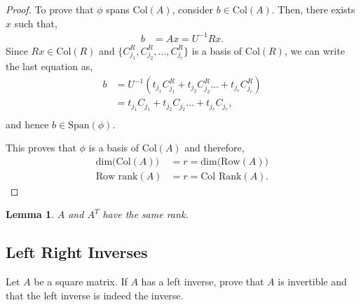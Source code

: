 \documentclass{amsart}
\theoremstyle{plain}
\newtheorem{lemma}{Lemma}
\numberwithin{equation}{section}
\begin{document}
\begin{proof}
To prove that $\phi$ spans $\mathrm{Col}(A)$, consider $b \in \mathrm{Col}(A)$.  
Then, there exists $x$ such that,
\begin{align*}
b &= A x = U^{-1}Rx.
\end{align*}
Since $Rx \in \mathrm{Col}(R)$ and $\{C^{R}_{j_1}, C^{R}_{j_2}, \ldots, C^{R}_{j_r}\}$ 
is a basis of $\mathrm{Col}(R)$, we can write the last equation as,
\begin{align*}
b &= U^{-1} (t_{j_1} C^{R}_{j_1} + t_{j_2} C^{R}_{j_2}  \ldots + t_{j_r} C^{R}_{j_r})\\
&= t_{j_1} C_{j_1} + t_{j_2} C_{j_2}  \ldots + t_{j_r} C_{j_r},\\
\end{align*}
and hence $b \in \mathrm{Span}(\phi)$. 

This proves that $\phi$ is a basis of $\mathrm{Col}(A)$ and therefore,
\begin{align*}
\mathrm{dim(Col}(A))&=r=\mathrm{dim(Row}(A))\\
\textrm{Row rank}(A)&=r=\textrm{Col Rank}(A).
\end{align*}

\end{proof}

\begin{lemma}
$A$ and $A^T$ have the same rank.
\end{lemma}

\subsection{Left Right Inverses}
Let $A$ be a square matrix. If $A$ has a left inverse, 
prove that $A$ is invertible and that the left inverse is indeed
the inverse. 
\end{document}
